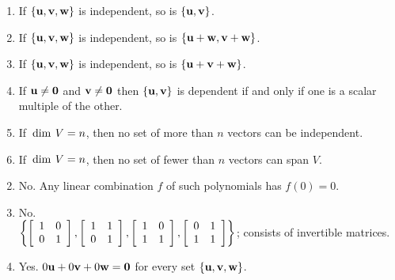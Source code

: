 \begin{multicols}{2}
\begin{ex}
\begin{enumerate}[label={\alph*.}]
\item If $\{\textbf{u}, \textbf{v}, \textbf{w}\}$ is independent, so is $\{\textbf{u}, \textbf{v}\}$.

\item If $\{\textbf{u}, \textbf{v}, \textbf{w}\}$ is independent, so is $\{\textbf{u} + \textbf{w}, \textbf{v} + \textbf{w}\}$.

\item If $\{\textbf{u}, \textbf{v}, \textbf{w}\}$ is independent, so is $\{\textbf{u} + \textbf{v} + \textbf{w}\}$.

\item If $\textbf{u} \neq \textbf{0}$ and $\textbf{v} \neq \textbf{0}$ then $\{\textbf{u}, \textbf{v}\}$ is dependent if and only if one is a scalar multiple of the other.

\item If $\thinspace\operatorname{dim\medspace} V = n$, then no set of more than $n$ vectors can be independent.

\item If $\thinspace\operatorname{dim\medspace} V = n$, then no set of fewer than $n$ vectors can span $V$.

\end{enumerate}
\begin{sol}
\begin{enumerate}[label={\alph*.}]
\setcounter{enumi}{1}
\item  No. Any linear combination $f$ of such polynomials has $f(0) = 0$.

\setcounter{enumi}{3}
\item  No. \\
$\left\{
\left[ \begin{array}{rr}
1 & 0 \\
0 & 1
\end{array} \right]
, 
\left[ \begin{array}{rr}
1 & 1 \\
0 & 1
\end{array} \right]
, 
\left[ \begin{array}{rr}
1 & 0 \\
1 & 1
\end{array} \right]
, 
\left[ \begin{array}{rr}
0 & 1 \\
1 & 1
\end{array} \right]
\right\}$; consists of invertible matrices.

\setcounter{enumi}{5}
\item  Yes. $0\textbf{u} + 0\textbf{v} + 0\textbf{w} = \textbf{0}$ for every set $\{\textbf{u}, \textbf{v}, \textbf{w}\}$.


\end{enumerate}
\end{sol}
\end{ex}
\end{multicols}
